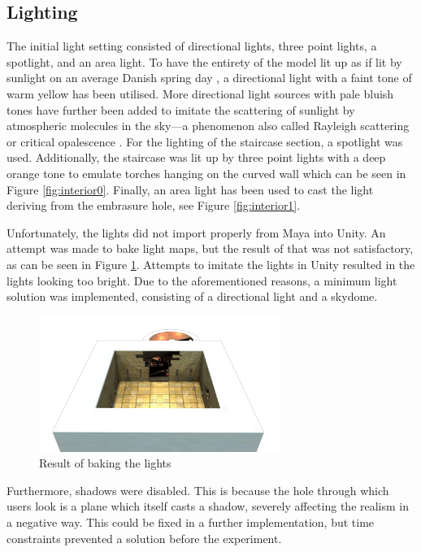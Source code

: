\subsection{Lighting}
The initial light setting consisted of directional lights, three point lights, a spotlight, and an area light. To have the entirety of the model lit up as if lit by sunlight on an average Danish spring day \cite{DMI}, a directional light with a faint tone of warm yellow has been utilised. More directional light sources with pale bluish tones have further been added to imitate the scattering of sunlight by atmospheric molecules in the sky---a phenomenon also called Rayleigh scattering or critical opalescence \cite{DOE} \cite{Renn2005}. For the lighting of the staircase section, a spotlight was used. Additionally, the staircase was lit up by three point lights with a deep orange tone to emulate torches hanging on the curved wall which can be seen in Figure \ref{fig:interior0}. Finally, an area light has been used to cast the light deriving from the embrasure hole, see Figure \ref{fig:interior1}.

Unfortunately, the lights did not import properly from Maya into Unity. An attempt was made to bake light maps, but the result of that was not satisfactory, as can be seen in Figure \ref{fig:baking_issue}. Attempts to imitate the lights in Unity resulted in the lights looking too bright. Due to the aforementioned reasons, a minimum light solution was implemented, consisting of a directional light and a skydome.

\begin{figure}[h!]
    \centering
    \includegraphics[width=0.7\textwidth]{figures/Baking_Issue.png}
    \caption{Result of baking the lights}\label{fig:baking_issue}
\end{figure}

Furthermore, shadows were disabled. This is because the hole through which users look is a plane which itself casts a shadow, severely affecting the realism in a negative way. This could be fixed in a further implementation, but time constraints prevented a solution before the experiment.

